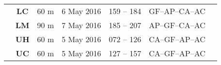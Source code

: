 \documentclass[12pt]{article}
\begin{document}
\begin{landscape}
\begin{table}[]
\begin{tabular}{ccccccl}
                                                                             & \textbf{LC}                                                  & 60 m                                                                     & 6 May 2016    & 159 -- 184                                                                 & GF--AP--CA--AC                                                     &                                                                                                                                                                                                                                                  \\
                                                                             & \textbf{LM}                                                  & 90 m                                                                     & 7 May 2016    & 185 -- 207                                                                 & AP--GF--CA--AC                                                     &                                                                                                                                                                                                                                                  \\
                                                                             & \textbf{UH}                                                  & 60 m                                                                     & 5 May 2016    & 072 -- 126                                                                 & CA--GF--AP--AC                                                     &                                                                                                                                                                                                                                                  \\
                                                                             & \textbf{UC}                                                  & 60 m                                                                     & 5 May 2016    & 127 -- 157                                                                 & CA--GF--AP--AC                                                     &                                                                                                                                                                                                                                                  \\

\end{tabular}
\end{table}
\end{landscape}
\end{document}
